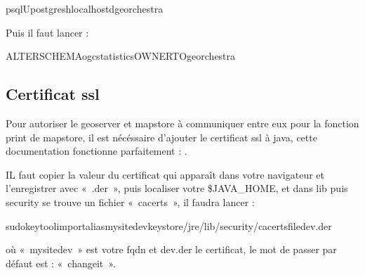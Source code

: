 \documentclass[letterpaper,10pt,french]{sphinxmanual}
\begin{document}
\begin{sphinxVerbatim}[commandchars=\\\{\}]
psql\PYGZhy{}Upostgres\PYGZhy{}hlocalhost\PYGZhy{}dgeorchestra
\end{sphinxVerbatim}

\sphinxAtStartPar
Puis il faut lancer :

\begin{sphinxVerbatim}[commandchars=\\\{\}]
ALTERSCHEMAogcstatisticsOWNERTOgeorchestra
\end{sphinxVerbatim}


\subsection{Certificat ssl}
\label{\detokenize{doc_instal/installation:certificat-ssl}}
\sphinxAtStartPar
Pour autoriser le geoserver et mapstore à communiquer entre eux pour la fonction print de mapstore, il est nécéssaire d’ajouter le certificat ssl à java,
cette documentation fonctionne parfaitement : .

\sphinxAtStartPar
IL faut copier la valeur du certificat qui apparaît dans votre navigateur et l’enregistrer avec « .der », puis localiser votre \$JAVA\_HOME, et dans lib puis security se trouve
un fichier « cacerts », il faudra lancer :

\begin{sphinxVerbatim}[commandchars=\\\{\}]
sudokeytool\PYGZhy{}import\PYGZhy{}aliasmysitedev\PYGZhy{}keystore/jre/lib/security/cacerts\PYGZhy{}filedev.der
\end{sphinxVerbatim}

\sphinxAtStartPar
où « mysitedev » est votre fqdn et dev.der le certificat, le mot de passer par défaut est : « changeit ».
\end{document}
